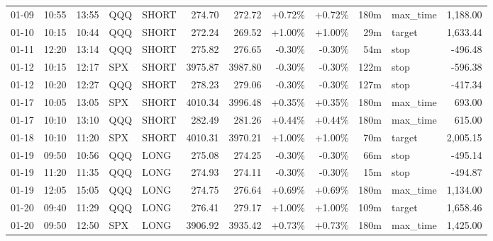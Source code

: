 \documentclass[11pt,a4paper]{article}
\begin{document}
\begin{center}
\begin{longtable}{>{\color{txtmain}}l l l l l r r r r r >{\color{txtmain}}l r}
01-09 & 10:55 & 13:55 & QQQ & SHORT & 274.70 & 272.72 & \textcolor{wingreen}{+0.72\%} & \textcolor{wingreen}{+0.72\%} & 180m & max\_time & \textcolor{wingreen}{1,188.00} \\
01-10 & 10:15 & 10:44 & QQQ & SHORT & 272.24 & 269.52 & \textcolor{wingreen}{+1.00\%} & \textcolor{wingreen}{+1.00\%} & 29m & target & \textcolor{wingreen}{1,633.44} \\
01-11 & 12:20 & 13:14 & QQQ & SHORT & 275.82 & 276.65 & \textcolor{lossred}{-0.30\%} & \textcolor{lossred}{-0.30\%} & 54m & stop & \textcolor{lossred}{-496.48} \\
01-12 & 10:15 & 12:17 & SPX & SHORT & 3975.87 & 3987.80 & \textcolor{lossred}{-0.30\%} & \textcolor{lossred}{-0.30\%} & 122m & stop & \textcolor{lossred}{-596.38} \\
01-12 & 10:20 & 12:27 & QQQ & SHORT & 278.23 & 279.06 & \textcolor{lossred}{-0.30\%} & \textcolor{lossred}{-0.30\%} & 127m & stop & \textcolor{lossred}{-417.34} \\
01-17 & 10:05 & 13:05 & SPX & SHORT & 4010.34 & 3996.48 & \textcolor{wingreen}{+0.35\%} & \textcolor{wingreen}{+0.35\%} & 180m & max\_time & \textcolor{wingreen}{693.00} \\
01-17 & 10:10 & 13:10 & QQQ & SHORT & 282.49 & 281.26 & \textcolor{wingreen}{+0.44\%} & \textcolor{wingreen}{+0.44\%} & 180m & max\_time & \textcolor{wingreen}{615.00} \\
01-18 & 10:10 & 11:20 & SPX & SHORT & 4010.31 & 3970.21 & \textcolor{wingreen}{+1.00\%} & \textcolor{wingreen}{+1.00\%} & 70m & target & \textcolor{wingreen}{2,005.15} \\
01-19 & 09:50 & 10:56 & QQQ & LONG & 275.08 & 274.25 & \textcolor{lossred}{-0.30\%} & \textcolor{lossred}{-0.30\%} & 66m & stop & \textcolor{lossred}{-495.14} \\
01-19 & 11:20 & 11:35 & QQQ & LONG & 274.93 & 274.11 & \textcolor{lossred}{-0.30\%} & \textcolor{lossred}{-0.30\%} & 15m & stop & \textcolor{lossred}{-494.87} \\
01-19 & 12:05 & 15:05 & QQQ & LONG & 274.75 & 276.64 & \textcolor{wingreen}{+0.69\%} & \textcolor{wingreen}{+0.69\%} & 180m & max\_time & \textcolor{wingreen}{1,134.00} \\
01-20 & 09:40 & 11:29 & QQQ & LONG & 276.41 & 279.17 & \textcolor{wingreen}{+1.00\%} & \textcolor{wingreen}{+1.00\%} & 109m & target & \textcolor{wingreen}{1,658.46} \\
01-20 & 09:50 & 12:50 & SPX & LONG & 3906.92 & 3935.42 & \textcolor{wingreen}{+0.73\%} & \textcolor{wingreen}{+0.73\%} & 180m & max\_time & \textcolor{wingreen}{1,425.00} \\

\end{longtable}
\end{center}
\end{document}
